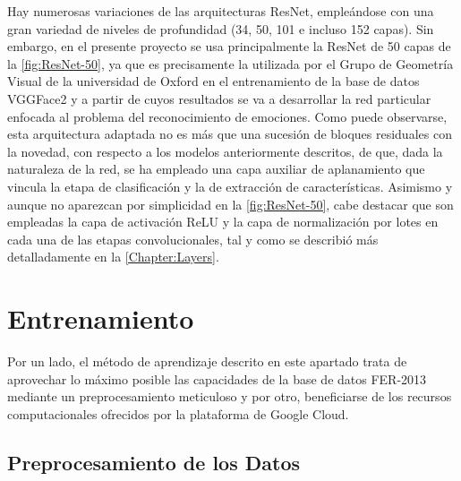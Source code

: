 Hay numerosas variaciones de las arquitecturas ResNet, empleándose con una gran variedad de niveles de profundidad (34, 50, 101 e incluso 152 capas). Sin embargo, en el presente proyecto se usa principalmente la ResNet de 50 capas de la \autoref{fig:ResNet-50}, ya que es precisamente la utilizada por el Grupo de Geometría Visual de la universidad de Oxford en el entrenamiento de la base de datos VGGFace2 \cite{VGGFace2} y a partir de cuyos resultados se va a desarrollar la red particular enfocada al problema del reconocimiento de emociones. Como puede observarse, esta arquitectura adaptada no es más que una sucesión de bloques residuales con la novedad, con respecto a los modelos anteriormente descritos, de que, dada la naturaleza de la red, se ha empleado una capa auxiliar de aplanamiento que vincula la etapa de clasificación y la de extracción de características. Asimismo y aunque no aparezcan por simplicidad en la \autoref{fig:ResNet-50}, cabe destacar que son empleadas la capa de activación ReLU y la capa de normalización por lotes en cada una de las etapas convolucionales, tal y como se describió más detalladamente en la \autoref{Chapter:Layers}.

\section{Entrenamiento}

Por un lado, el método de aprendizaje descrito en este apartado trata de aprovechar lo máximo posible las capacidades de la base de datos FER-2013 mediante un preprocesamiento meticuloso y por otro, beneficiarse de los recursos computacionales ofrecidos por la plataforma de Google Cloud.

\subsection{Preprocesamiento de los Datos}

